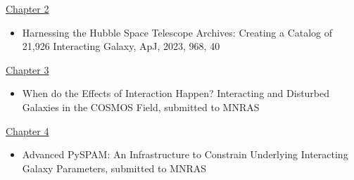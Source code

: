 


\begin{pubs}        %
\newif\ifshowcitations\showcitationsfalse%
\newif\ifshowlinks\showlinksfalse%

%
%
%

\ifshowlinks%
  \usepackage[
         colorlinks=true,
         urlcolor=blue,       %
         ]{hyperref}
  \newcommand*{\inspireurl}[1]{\\\href{#1}{INSPIRE-HEP entry}}
\else
  \makeatletter
  \newcommand*{\inspireurl}[1]{\@bsphack\@esphack}
  \makeatother
\fi
\ifshowcitations%
  \newcommand*{\citations}[1]{\\* #1}
\else
  \makeatletter
  \newcommand*{\citations}[1]{\@bsphack\@esphack}
  \makeatother
\fi
\renewcommand{\labelenumii}{\arabic{enumi}.\arabic{enumii}}


%
\underline{Chapter 2}
\begin{itemize}
	\item Harnessing the Hubble Space Telescope Archives: Creating a Catalog of 21,926 Interacting Galaxy, ApJ, 2023, 968, 40
\end{itemize}

\underline{Chapter 3}
\begin{itemize}
	\item When do the Effects of Interaction Happen? Interacting and Disturbed Galaxies in the COSMOS Field, submitted to MNRAS
\end{itemize}

\underline{Chapter 4}
\begin{itemize}
	\item Advanced PySPAM: An Infrastructure to Constrain Underlying Interacting Galaxy Parameters, submitted to MNRAS
\end{itemize}

\end{pubs}

